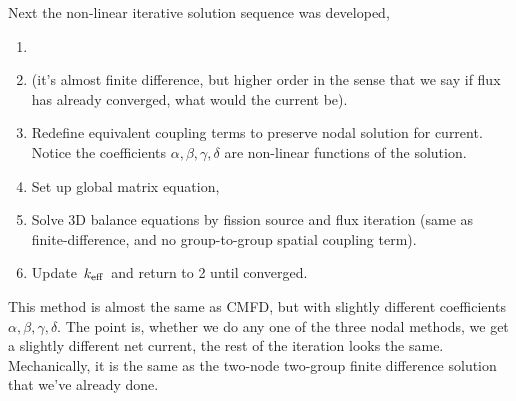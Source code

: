 \documentclass{school-22.211-notes}
\begin{document}
Next the non-linear iterative solution sequence was developed,
\begin{enumerate}
\item 
\item  (it's almost finite difference, but higher order in the sense that we say if flux has already converged, what would the current be). 

\item Redefine equivalent coupling terms to preserve nodal solution for current. Notice the coefficients $\alpha, \beta, \gamma, \delta$ are non-linear functions of the solution. 

\item Set up global matrix equation,

\item Solve 3D balance equations by fission source and flux iteration (same as finite-difference, and no group-to-group spatial coupling term). 

\item Update $\left. k_{\mathrm{eff}} \right.$ and return to 2 until converged. 
\end{enumerate}
This method is almost the same as CMFD, but with slightly different coefficients $\alpha, \beta, \gamma, \delta$. The point is, whether we do any one of the three nodal methods, we get a slightly different net current, the rest of the iteration looks the same. Mechanically, it is the same as the two-node two-group finite difference solution that we've already done. 



\clearpage
{}
\end{document}
